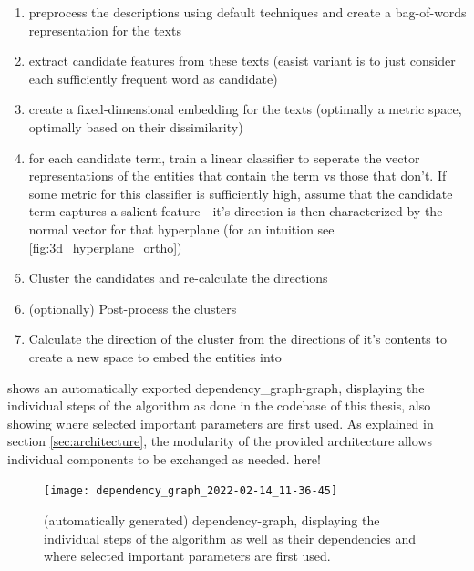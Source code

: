 \begin{enumerate}
	\item preprocess the descriptions using default techniques and create a bag-of-words representation for the texts
	\item extract candidate features from these texts (easist variant is to just consider each sufficiently frequent word as candidate)
	\item create a fixed-dimensional embedding for the texts (optimally a metric space, optimally based on their dissimilarity)
	\item for each candidate term, train a linear classifier to seperate the vector representations of the entities that contain the term vs those that don't. If some metric for this classifier is sufficiently high, assume that the candidate term captures a salient feature - it's direction is then characterized by the normal vector for that hyperplane (for an intuition see \ref{fig:3d_hyperplane_ortho})
	\item Cluster the candidates and re-calculate the directions
	\item (optionally) Post-process the clusters 
	\item Calculate the direction of the cluster from the directions of it's contents to create a new space to embed the entities into
\end{enumerate}


 shows an automatically exported dependency_graph-graph, displaying the individual steps of the algorithm as done in the codebase of this thesis, also showing where selected important parameters are first used. As explained in section \ref{sec:architecture}, the modularity of the provided architecture allows individual components to be exchanged as needed.
  here!


\begin{figure}[htp]
	\begin{center}
	  \texttt{[image: dependency\_graph\_2022-02-14\_11-36-45]}
	  \caption[Dependency-Graph of the Algorithm]{(automatically generated) dependency-graph, displaying the individual steps of the algorithm as well as their dependencies and where selected important parameters are first used.}
	  \label{fig:dependency_graph}
	\end{center}
\end{figure}


